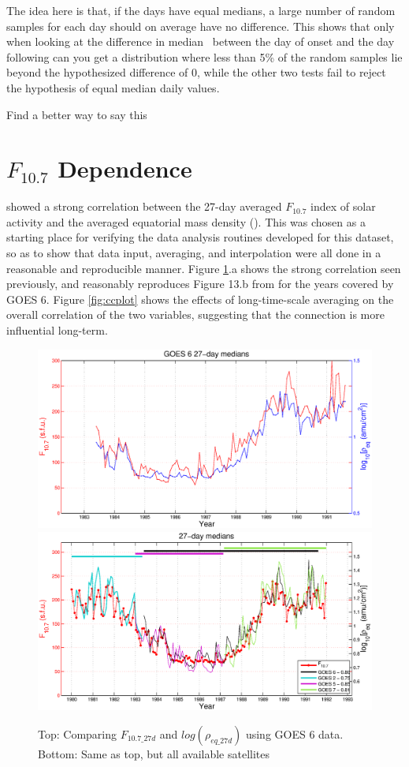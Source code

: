 The idea here is that, if the days have equal medians, a large number of random samples for each day should on average have no difference. This shows that only when looking at the difference in median \req\ between the day of onset and the day following can you get a distribution where less than 5\% of the random samples lie beyond the hypothesized difference of 0, while the other two tests fail to reject the hypothesis of equal median daily values.  

\vnote Find a better way to say this

\section{$F_{10.7}$ Dependence}
\cite{Takahashi2010SolarCycleVariation} showed a strong correlation between the 27-day averaged $F_{10.7}$ index of solar activity and the averaged equatorial mass density (\req). This was chosen as a starting place for verifying the data analysis routines developed for this dataset, so as to show that data input, averaging, and interpolation were all done in a reasonable and reproducible manner. Figure \ref{fig:F107rhoeq27dcomparison}.a shows the strong correlation seen previously, and reasonably reproduces Figure 13.b from \cite{Takahashi2010SolarCycleVariation} for the years covered by GOES 6. Figure \ref{fig:ccplot} shows the effects of long-time-scale averaging on the overall correlation of the two variables, suggesting that the connection is more influential long-term.

\begin{figure}[htp!]
	\centering
	\includegraphics[width=0.85\linewidth]{Figures/F107MD27d-GOES6}
		\includegraphics[width=0.85\linewidth]{Figures/F107MD27d-all}
	\caption{Top: Comparing $F_{10.7\_27d}$ and $log(\rho_{eq\_27d})$ using GOES 6 data. Bottom: Same as top, but all available satellites}
	\label{fig:F107rhoeq27dcomparison}
\end{figure}

